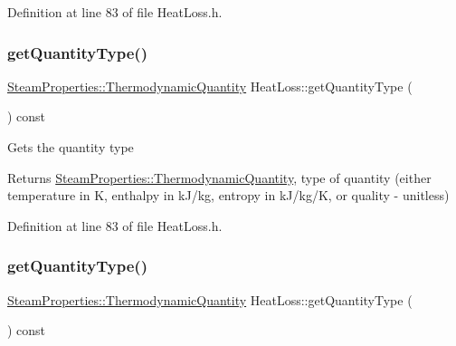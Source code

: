 Definition at line 83 of file Heat\+Loss.\+h.

\mbox{\label{class_heat_loss_a92dc973c0fd81df192207b3df55d6c2b}} 
\subsubsection{\texorpdfstring{get\+Quantity\+Type()}{getQuantityType()}\hspace{0.1cm}{\footnotesize\ttfamily [2/3]}}
{\footnotesize\ttfamily \hyperlink{class_steam_properties_ae0294bedf7d178c2d8fb6aed0f62fbff}{Steam\+Properties\+::\+Thermodynamic\+Quantity} Heat\+Loss\+::get\+Quantity\+Type (\begin{DoxyParamCaption}{ }\end{DoxyParamCaption}) const\hspace{0.3cm}{\ttfamily [inline]}}

Gets the quantity type \begin{DoxyReturn}{Returns}
\hyperlink{class_steam_properties_ae0294bedf7d178c2d8fb6aed0f62fbff}{Steam\+Properties\+::\+Thermodynamic\+Quantity}, type of quantity (either temperature in K, enthalpy in k\+J/kg, entropy in k\+J/kg/K, or quality -\/ unitless) 
\end{DoxyReturn}


Definition at line 83 of file Heat\+Loss.\+h.

\mbox{\label{class_heat_loss_a92dc973c0fd81df192207b3df55d6c2b}} 
\subsubsection{\texorpdfstring{get\+Quantity\+Type()}{getQuantityType()}\hspace{0.1cm}{\footnotesize\ttfamily [3/3]}}
{\footnotesize\ttfamily \hyperlink{class_steam_properties_ae0294bedf7d178c2d8fb6aed0f62fbff}{Steam\+Properties\+::\+Thermodynamic\+Quantity} Heat\+Loss\+::get\+Quantity\+Type (\begin{DoxyParamCaption}{ }\end{DoxyParamCaption}) const\hspace{0.3cm}{\ttfamily [inline]}}

